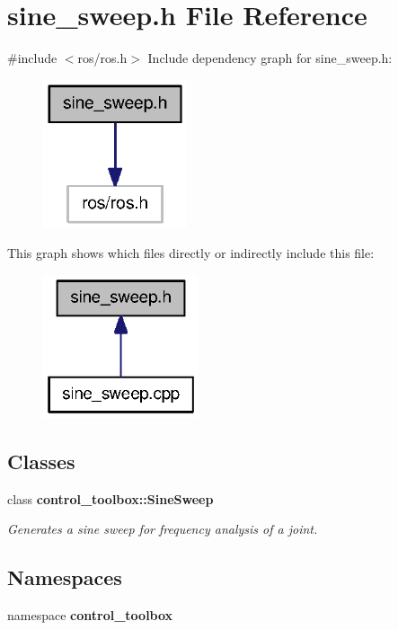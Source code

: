\section{sine\-\_\-sweep.\-h \-File \-Reference}
\label{sine__sweep_8h}
{\ttfamily \#include $<$ros/ros.\-h$>$}\*
\-Include dependency graph for sine\-\_\-sweep.\-h\-:
\nopagebreak
\begin{figure}[H]
\begin{center}
\leavevmode
\includegraphics[width=120pt]{sine__sweep_8h__incl}
\end{center}
\end{figure}
\-This graph shows which files directly or indirectly include this file\-:
\nopagebreak
\begin{figure}[H]
\begin{center}
\leavevmode
\includegraphics[width=130pt]{sine__sweep_8h__dep__incl}
\end{center}
\end{figure}
\subsection*{\-Classes}
\begin{DoxyCompactItemize}
\item 
class {\bf control\-\_\-toolbox\-::\-Sine\-Sweep}
\begin{DoxyCompactList}\small\item\em \-Generates a sine sweep for frequency analysis of a joint. \end{DoxyCompactList}\end{DoxyCompactItemize}
\subsection*{\-Namespaces}
\begin{DoxyCompactItemize}
\item 
namespace {\bf control\-\_\-toolbox}
\end{DoxyCompactItemize}
